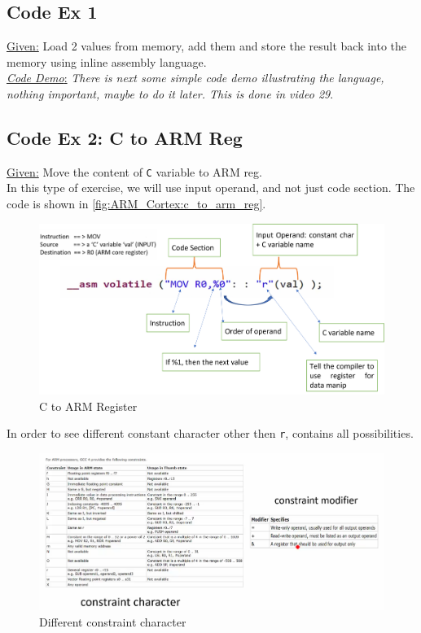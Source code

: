 \subsection{Code Ex 1}

\underline{Given:} Load 2 values from memory, add them and store the result back into the memory using inline assembly language. \\

 \underline{\textit{Code Demo}:} \textit{There is next some simple code demo illustrating the language, nothing important, maybe to do it later. This is done in video 29}. 


\subsection{Code Ex 2: C to ARM Reg}

\underline{Given:} Move the content of \verb|C| variable to ARM reg.\\

In this type of exercise, we will use input operand, and not just code section. The code is shown in \autoref{fig:ARM_Cortex:c_to_arm_reg}.


\begin{figure}[h]
\centering
\includegraphics[scale=0.55]{Figures/ARM_Cortex/c_to_arm_reg}
\caption{C to ARM Register}
\label{fig:ARM_Cortex:c_to_arm_reg}
\end{figure}



\newpage
In order to see different constant character other then \verb|r|, contains all possibilities.


\begin{figure}[h]
\centering
\includegraphics[scale=0.9]{Figures/ARM_Cortex/constraint_char_assembly}
\caption{Different constraint character}
\label{fig:ARM_Cortex:constraint_char_assembly}
\end{figure}

